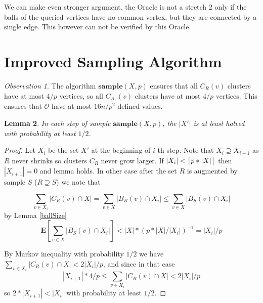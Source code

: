 \documentclass[shortabstract, lic, english]{iithesis}
\theoremstyle{definition} \newtheorem{definition}{Definition}[chapter]
\theoremstyle{remark} \newtheorem{remark}[definition]{Observation}
\theoremstyle{plain} \newtheorem{theorem}[definition]{Theorem}
\theoremstyle{plain} \newtheorem{lemma}[definition]{Lemma}
\theoremstyle{plain} \newtheorem{conjecture}[definition]{Conjecture}
\DeclarePairedDelimiter{\ceil}{\lceil}{\rceil}
\begin{document}
We can make even stronger argument, the Oracle is not a stretch $2$ only if the balls of the queried vertices have no common vertex, but they are connected by a single edge.
This however can not be verified by this Oracle.


\section{Improved Sampling Algorithm}

\noindent{}

\begin{remark} \label{clusterSize}
The algorithm $\mathbf{sample}(X, p)$ ensures that all $C_R(v)$ clusters have at most $4/p$ vertices, so all $C_{A_1}(v)$ clusters have at most $4/p$ vertices.
This ensures that $\mathcal{O}$ have at most $16n/p^2$ defined values.
\end{remark}

\begin{lemma} \label{algSampleLogSteps}
    In each step of sample $\mathbf{sample}(X, p)$, the $|X'|$ is at least halved with probability at least $1/2$.
\end{lemma}

\begin{proof}
    Let $X_i$ be the set $X'$ at the beginning of $i$-th step. Note that $X_i \supseteq X_{i+1}$ as $R$ never shrinks so clusters $C_R$ never grow larger.
    If $|X_i| < \ceil[\big]{p * |X|}$ then $|X_{i+1}| = 0$ and lemma holds.
    In other case after the set $R$ is augmented by sample $S$ ($R \supseteq S$) we note that
    

    $$\sum_{v \in X_i} |C_R(v) \cap X| = \sum_{v \in X} |B_R(v) \cap X_i| \leq \sum_{v \in X} |B_S(v) \cap X_i| $$
    by Lemma \ref{ballSize}
    $$\mathbf{E}[\sum_{v \in X} |B_S(v) \cap X_i|] < |X| * (p * |X|/|X_i|)^{-1} = |X_i|/p$$

    By Markov inequality with probability $1/2$ we have $\sum_{v \in X_i} |C_R(v) \cap X| < 2|X_i|/p$,
    and since in that case 
    $$|X_{i+1}| * 4/p \leq \sum_{v \in X_i} |C_R(v) \cap X| < 2|X_i|/p$$
    so $2 * |X_{i+1}| < |X_i|$ with probability at least $1/2$.

\end{proof}
\end{document}
